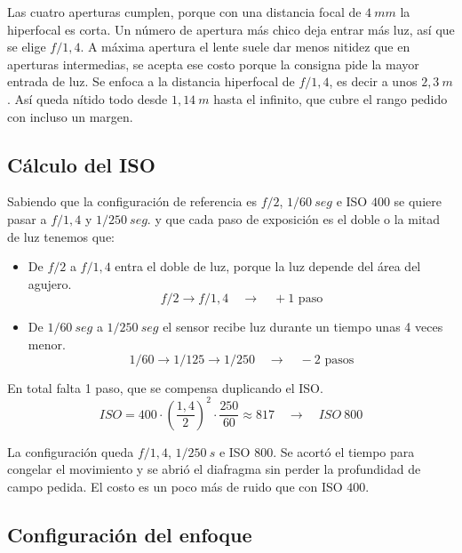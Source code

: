         Las cuatro aperturas cumplen, porque con una distancia focal de $4\:mm$ la hiperfocal es corta. Un número de apertura más chico deja entrar más luz, así que se elige $f/1{,}4$. A máxima apertura el lente suele dar menos nitidez que en aperturas intermedias, se acepta ese costo porque la consigna pide la mayor entrada de luz. Se enfoca a la distancia hiperfocal de $f/1{,}4$, es decir a unos $2{,}3\:m$. Así queda nítido todo desde $1{,}14\:m$ hasta el infinito, que cubre el rango pedido con incluso un margen.

    \subsection{Cálculo del ISO}

        Sabiendo que la configuración de referencia es $f/2$, $1/60\:seg$ e ISO $400$ se quiere pasar a $f/1{,}4$ y $1/250\:seg.$ y que cada paso de exposición es el doble o la mitad de luz tenemos que:

        \begin{itemize}
            \item De $f/2$ a $f/1{,}4$ entra el doble de luz, porque la luz depende del área del agujero.
            \begin{equation*}
                f/2 \rightarrow f/1{,}4 \quad\longrightarrow\quad +1 \text{ paso}
            \end{equation*}
            \item De $1/60\:seg$ a $1/250\:seg$ el sensor recibe luz durante un tiempo unas 4 veces menor.
            \begin{equation*}
                1/60 \rightarrow 1/125 \rightarrow 1/250 \quad\longrightarrow\quad -2 \text{ pasos}
            \end{equation*}
        \end{itemize}

        En total falta 1 paso, que se compensa duplicando el ISO.
        \begin{equation}
            ISO = 400 \cdot \left(\frac{1{,}4}{2}\right)^2 \cdot \frac{250}{60} \approx 817 \quad \longrightarrow \quad ISO\ 800
        \end{equation}

        La configuración queda $f/1{,}4$, $1/250\:s$ e ISO $800$. Se acortó el tiempo para congelar el movimiento y se abrió el diafragma sin perder la profundidad de campo pedida. El costo es un poco más de ruido que con ISO $400$.

    \subsection{Configuración del enfoque}

